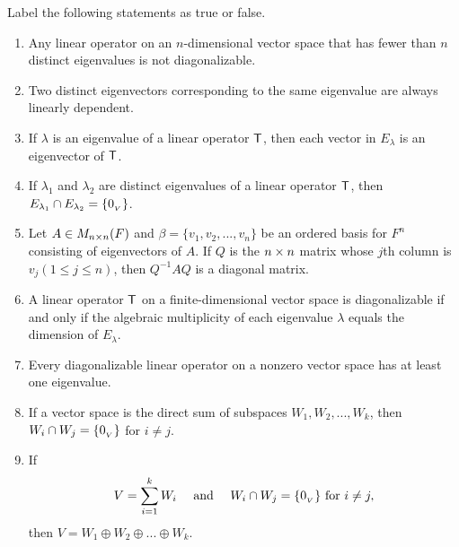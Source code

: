 \exercisesection

\begin{exercise} \label{exercise 5.2.1}
Label the following statements as true or false.
\begin{enumerate}
\item Any linear operator on an \(n\)-dimensional vector space that has fewer than \(n\) distinct eigenvalues is not diagonalizable.
\item Two distinct eigenvectors corresponding to the same eigenvalue are always linearly dependent.
\item If \(\lambda\) is an eigenvalue of a linear operator \(\textsf{T}\), then each vector in \(E_{\lambda}\) is an eigenvector of \(\textsf{T}\).
\item If \(\lambda_1\) and \(\lambda_2\) are distinct eigenvalues of a linear operator \(\textsf{T}\), then \(E_{\lambda_1} \cap E_{\lambda_2} = \{ 0_{_V} \}\).
\item Let \(A \in M_{n \times n}(F)\) and \(\beta = \{ v_1, v_2, ..., v_n \}\) be an ordered basis for \(F^n\) consisting of eigenvectors of \(A\).
If \(Q\) is the \(n \times n\) matrix whose \(j\)th column is \(v_j (1 \le j \le n)\), then \(Q^{-1} A Q\) is a diagonal matrix.
\item A linear operator \(\textsf{T}\) on a finite-dimensional vector space is diagonalizable if and only if the algebraic multiplicity of each eigenvalue \(\lambda\) equals the dimension of \(E_{\lambda}\).
\item Every diagonalizable linear operator on a nonzero vector space has at least one eigenvalue.
\item If a vector space is the direct sum of subspaces \(W_1, W_2, ..., W_k\), then \(W_i \cap W_j = \{ 0_{_V} \}\) for \(i \ne j\).

\item If
\[
    V = \sum_{i = 1}^k W_i \quad \text{ and } \quad W_i \cap W_j = \{ 0_{_V} \} \text{ for } i \ne j,
\]
then \(V = W_1 \oplus W_2 \oplus ... \oplus W_k\).
\end{enumerate}
\end{exercise}

